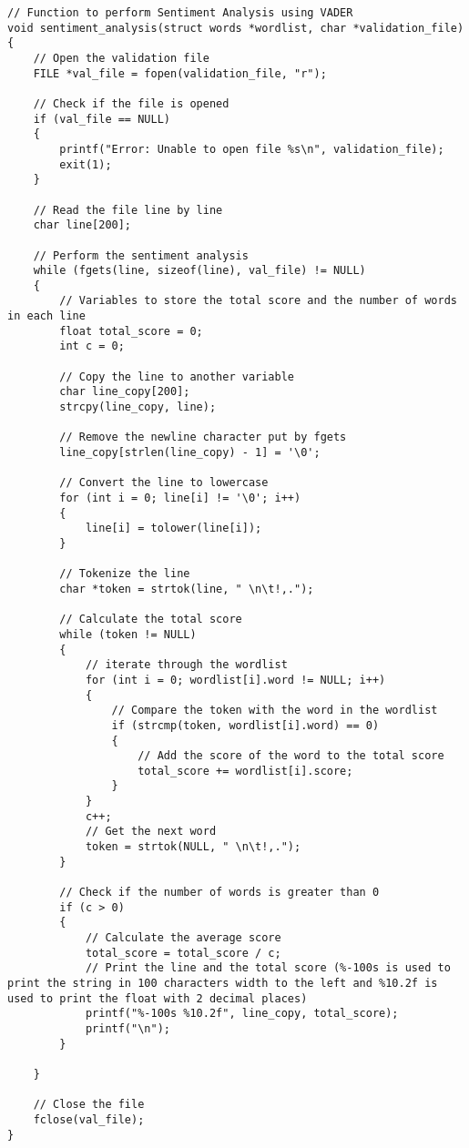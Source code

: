 \documentclass[a4paper,11pt]{article}
\theoremstyle{mytheor}
\begin{document}
\begin{lstlisting}[label={list:sixth},caption=sentiment\_analysis() function]
// Function to perform Sentiment Analysis using VADER
void sentiment_analysis(struct words *wordlist, char *validation_file)
{
    // Open the validation file
    FILE *val_file = fopen(validation_file, "r");

    // Check if the file is opened
    if (val_file == NULL)
    {
        printf("Error: Unable to open file %s\n", validation_file);
        exit(1);
    }

    // Read the file line by line
    char line[200];

    // Perform the sentiment analysis
    while (fgets(line, sizeof(line), val_file) != NULL)
    {
        // Variables to store the total score and the number of words in each line
        float total_score = 0;
        int c = 0;
        
        // Copy the line to another variable
        char line_copy[200];
        strcpy(line_copy, line);

        // Remove the newline character put by fgets
        line_copy[strlen(line_copy) - 1] = '\0';

        // Convert the line to lowercase
        for (int i = 0; line[i] != '\0'; i++)
        {
            line[i] = tolower(line[i]);
        }
        
        // Tokenize the line
        char *token = strtok(line, " \n\t!,.");

        // Calculate the total score
        while (token != NULL)
        {
            // iterate through the wordlist
            for (int i = 0; wordlist[i].word != NULL; i++)
            {
                // Compare the token with the word in the wordlist
                if (strcmp(token, wordlist[i].word) == 0)
                {
                    // Add the score of the word to the total score
                    total_score += wordlist[i].score;
                }
            }
            c++;
            // Get the next word
            token = strtok(NULL, " \n\t!,.");
        }
        
        // Check if the number of words is greater than 0
        if (c > 0)
        {
            // Calculate the average score
            total_score = total_score / c;
            // Print the line and the total score (%-100s is used to print the string in 100 characters width to the left and %10.2f is used to print the float with 2 decimal places)
            printf("%-100s %10.2f", line_copy, total_score);
            printf("\n");
        }

    }
    
    // Close the file
    fclose(val_file);
}
\end{lstlisting}
\end{document}
